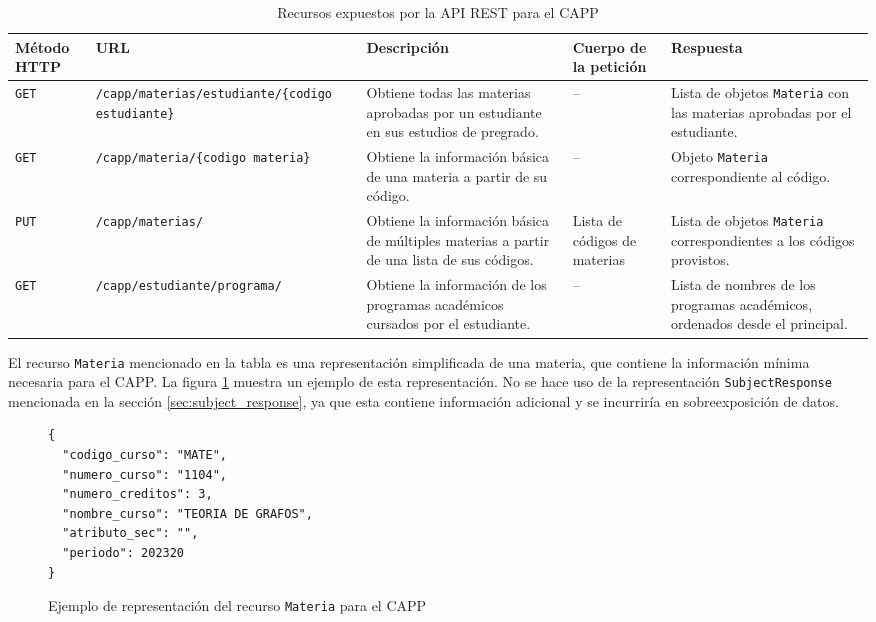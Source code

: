 \begin{table}[H]
  \centering
  \alternatecolors
  \caption{Recursos expuestos por la API REST para el CAPP}
  \label{tab:capp_api_resources}
  \begin{tabular}{p{1.5cm}p{2.6cm}p{3.8cm}p{2cm}p{3cm}}
  \hline
  \textbf{Método HTTP} & \textbf{URL} & \textbf{Descripción} & \textbf{Cuerpo de la petición} & \textbf{Respuesta} \\ \hline
  \texttt{GET} & \texttt{/capp}\newline\texttt{/materias}\newline\texttt{/estudiante}\newline\texttt{/\{codigo estudiante\}} & Obtiene todas las materias aprobadas por un estudiante en sus estudios de pregrado. & -- & Lista de objetos \texttt{Materia} con las materias aprobadas por el estudiante. \\
  \texttt{GET} & \texttt{/capp}\newline\texttt{/materia}\newline\texttt{/\{codigo materia\}} & Obtiene la información básica de una materia a partir de su código. & -- & Objeto \texttt{Materia} correspondiente al código. \\
  \texttt{PUT} & \texttt{/capp}\newline\texttt{/materias/}   & Obtiene la información básica de múltiples materias a partir de una lista de sus códigos. & Lista de códigos de materias & Lista de objetos \texttt{Materia} correspondientes a los códigos provistos. \\
  \texttt{GET} & \texttt{/capp}\newline\texttt{/estudiante}\newline\texttt{/programa/} & Obtiene la información de los programas académicos cursados por el estudiante. & -- & Lista de nombres de los programas académicos, ordenados desde el principal. \\ 
  \end{tabular}
\end{table}

El recurso \verb|Materia| mencionado en la tabla es una representación simplificada de una materia, que contiene la información mínima necesaria para el \gls{CAPP}. La figura \ref{lst:subject_capp} muestra un ejemplo de esta representación. No se hace uso de la representación \verb|SubjectResponse| mencionada en la sección \ref{sec:subject_response}, %
ya que esta contiene información adicional y se incurriría en sobreexposición de datos.

\begin{figure}[h]
  \centering
  \begin{verbatim}
{
  "codigo_curso": "MATE",
  "numero_curso": "1104",
  "numero_creditos": 3,
  "nombre_curso": "TEORIA DE GRAFOS",
  "atributo_sec": "",
  "periodo": 202320
}
  \end{verbatim}
  \caption{Ejemplo de representación del recurso \texttt{Materia} para el \gls{CAPP}}
  \label{lst:subject_capp}
\end{figure}  
